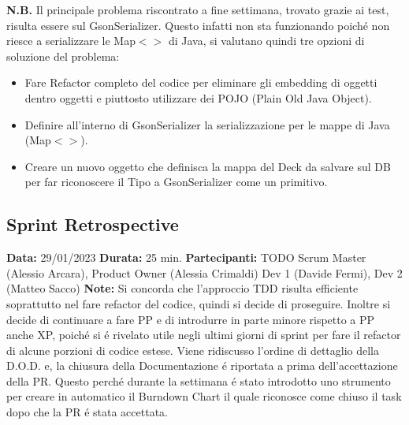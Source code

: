 \documentclass{article}
\begin{document}
    \newline \textbf{N.B.} Il principale problema riscontrato a fine settimana, trovato grazie ai test, risulta essere sul GsonSerializer. Questo infatti non sta funzionando poich\'e non riesce a serializzare le Map$<$$>$ di Java, si valutano quindi tre opzioni di soluzione del problema:
    \begin{itemize}
        \item Fare Refactor completo del codice per eliminare gli embedding di oggetti dentro oggetti e piuttosto utilizzare dei POJO (Plain Old Java Object).
        \item Definire all'interno di GsonSerializer la serializzazione per le mappe di Java (Map$<$$>$).
        \item Creare un nuovo oggetto che definisca la mappa del Deck da salvare sul DB per far riconoscere il Tipo a GsonSerializer come un primitivo.
    \end{itemize}


    \subsection{Sprint Retrospective}
    \textbf{Data:} 29/01/2023
    \newline \textbf{Durata:} 25 min.
    \newline \textbf{Partecipanti:} TODO Scrum Master (Alessio Arcara), Product Owner (Alessia Crimaldi) Dev 1 (Davide Fermi), Dev 2 (Matteo Sacco)
    \newline \textbf{Note:} Si concorda che l'approccio TDD risulta efficiente soprattutto nel fare refactor del codice, quindi si decide di proseguire. Inoltre si decide di continuare a fare PP e di introdurre in parte minore rispetto a PP anche XP, poich\'e si \'e rivelato utile negli ultimi giorni di sprint per fare il refactor di alcune porzioni di codice estese.
    \newline Viene ridiscusso l'ordine di dettaglio della D.O.D. e, la chiusura della Documentazione \'e riportata a prima dell'accettazione della PR. Questo perch\'e durante la settimana \'e stato introdotto uno strumento per creare in automatico il Burndown Chart il quale riconosce come chiuso il task dopo che la PR \'e stata accettata.


    \newpage
\end{document}
